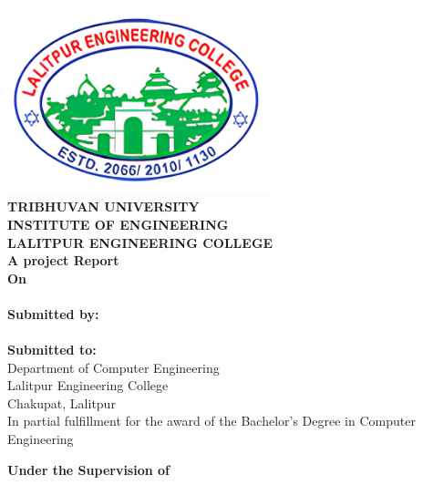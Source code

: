\begin{center}
    \linespread{1.6}
    \thispagestyle{empty}
    \includegraphics[width= 3in ]{img/leclogo21.png} \\
    \vspace{0.05 in}
    {\fontsize{12 pt}{12} \selectfont\textbf{TRIBHUVAN UNIVERSITY} \\
        \textbf{INSTITUTE OF ENGINEERING} \\
        \textbf{LALITPUR ENGINEERING COLLEGE}} \\

    \vspace{0.5 in}
    \textbf{A project Report}\\
    {\fontsize{12 pt}{12} \selectfont\textbf{On}\\}
    {\fontsize{12 pt}{12} \selectfont \textbf{\thetitle}}\\
    \vspace{0.5 in}
    \textbf{ Submitted by:}  \\
    {\theauthor} \\
    \vspace{0.4 in}
    \textbf{ Submitted to:}  \\
    Department of Computer Engineering \\
    Lalitpur Engineering College \\
    Chakupat, Lalitpur \\

    \vspace{0.3in}
    In partial fulfillment for the award of the
    Bachelor's Degree in Computer Engineering

    \vspace{0.3in}
    \textbf{Under the Supervision of} \\
    \thesupervisor\\
    \vspace{0.3in}
    \thedate

\end{center}
